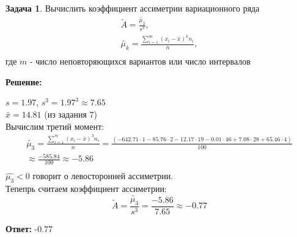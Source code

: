\documentclass[a4paper,11pt]{article}
\theoremstyle{definition}
\newtheorem{problem}{Задача}\setlength{\parindent}{0pt}
\newenvironment{solution}
{\begin{shaded}\textbf{Решение:}\par\setlength{\parindent}{0pt}}
{\end{shaded}}
\newenvironment{answer}
{\par\noindent\textbf{Ответ:} }
{\par}
\begin{document}
\vspace{8pt}
\begin{problem}
    Вычислить коэффициент ассиметрии вариационного ряда
    \begin{gather*}
        \tilde{A} = \frac{\tilde{\mu_3}}{s^3},\\
        \tilde{\mu_k} = \frac{\sum^m_{i=1}(x_i - \bar{x})^k n_i}{n},\\
    \end{gather*}
    где \(m\) - число неповторяющихся вариантов или число интервалов     
        
    \begin{solution}
        \(s = 1.97\), \( s^3 = 1.97^3 \approx 7.65 \)\\
        \(\bar{x} = 14.81\) (из задания 7)\\

        Вычислим третий момент:
        \begin{gather*}
            \tilde{\mu_3} = \frac{\sum^m_{i=1}(x_i - \bar{x})^3 n_i}{n} =
        \frac{(      -642.71\cdot1
                     -85.76\cdot2
                     -12.17\cdot19
                     -0.01\cdot46
                     +7.08\cdot28
                     +65.46\cdot4
                     )}{100}\\
            \approx \frac{-585.84}{100} \approx -5.86\\
        \end{gather*}
        \(\hat{\mu_3} < 0\) говорит о левосторонней ассиметрии. \\
        
        Тепепрь считаем коэффициент ассиметрии:
        \[ \tilde{A} = \frac{\tilde{\mu_3}}{s^3} = \frac{-5.86}{7.65} \approx - 0.77\]

        \end{solution}
    
        \begin{answer}
            -0.77
        \end{answer}
    
    \end{problem}
\end{document}
